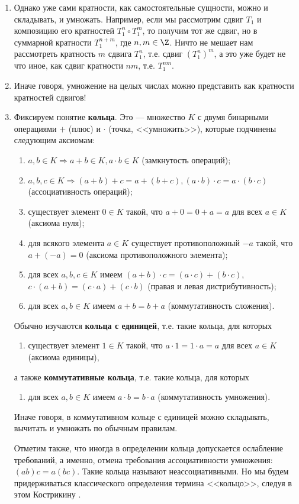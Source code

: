 \begin{enumerate}
\item Однако уже сами кратности, как самостоятельные сущности, можно и складывать, и умножать. Например, если мы рассмотрим сдвиг $T_1$ и композицию его кратностей $T_1^n\circ T_1^m$, то получим тот же сдвиг, но в суммарной кратности $T_1^{n+m}$, где $n,m\in\Z$. Ничто не мешает нам рассмотреть кратность $m$ сдвига $T_1^n$, т.е. сдвиг $(T_1^n)^m$, а это уже будет не что иное, как сдвиг кратности $nm$, т.е. $T_1^{nm}$.
\item Иначе говоря, умножение на целых числах можно представить как кратности кратностей сдвигов!

\item Фиксируем понятие \textbf{кольца}. Это --- множество $K$ с двумя бинарными операциями $+$ (плюс) и $\cdot$ (точка, <<умножить>>), которые подчинены следующим аксиомам:\label{Ring}
\begin{enumerate}[{\bf R}1]
\item $a,b\in K\Rightarrow a+b\in K, a\cdot b\in K$ (замкнутость операций);
\item $a,b,c\in K\Rightarrow (a+b)+c=a+(b+c), (a\cdot b)\cdot c = a\cdot (b\cdot c)$ (ассоциативность операций);
\item существует элемент $0\in K$ такой, что $a+0=0+a=a$ для всех $a\in K$ (аксиома нуля);
\item для всякого элемента $a\in K$ существует противоположный $-a$ такой, что $a+(-a)=0$ (аксиома противоположного элемента);
\item для всех $a,b,c\in K$ имеем $(a+b)\cdot c=(a\cdot c)+(b\cdot c)$, $c\cdot(a+b)=(c\cdot a)+(c\cdot b)$ (правая и левая дистрибутивность);
\item для всех $a,b\in K$ имеем $a+b=b+a$ (коммутативность сложения).
\end{enumerate}

Обычно изучаются \textbf{кольца с единицей}, т.е. такие кольца, для которых
\begin{enumerate}[resume*]
\item существует элемент $1\in K$ такой, что $a\cdot 1=1\cdot a=a$ для всех $a\in K$ (аксиома единицы),
\end{enumerate}
а также \textbf{коммутативные кольца}, т.е. такие кольца, для которых
\begin{enumerate}[resume*]
\item для всех $a,b\in K$ имеем $a\cdot b=b\cdot a$ (коммутативность умножения).
\end{enumerate}

Иначе говоря, в коммутативном кольце с единицей можно складывать, вычитать и умножать по обычным правилам.

Отметим также, что иногда в определении кольца допускается ослабление требований, а именно, отмена требования ассоциативности умножения: $(ab)c = a(bc)$. Такие кольца называют неассоциативными. Но мы будем придерживаться классического определения термина <<кольцо>>, следуя в этом Кострикину \cite{Kostrikin}.
\end{enumerate}


